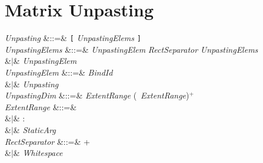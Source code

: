 %
%
%
%

\section{Matrix Unpasting}



\begin{Grammar}
\emph{Unpasting} &::=& \texttt{[} \emph{UnpastingElems} \texttt{]} \\

\emph{UnpastingElems}
&::=& \emph{UnpastingElem} \emph{RectSeparator} \emph{UnpastingElems} \\
&$|$& \emph{UnpastingElem} \\

\emph{UnpastingElem}
&::=& \emph{BindId}  \\
&$|$& \emph{Unpasting} \\

\emph{UnpastingDim} &::=& \emph{ExtentRange} (\BY\ \emph{ExtentRange})$^+$ \\

\emph{ExtentRange}
&::=& 
\\
&$|$& \KWD:\\
&$|$& \emph{StaticArg} \\

\emph{RectSeparator} &::=& \EXP{;}+\\
&$|$& \emph{Whitespace}\\
\end{Grammar}

